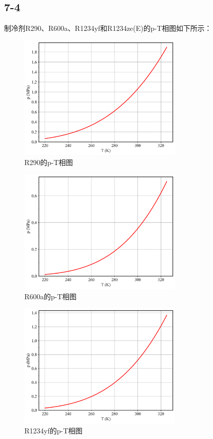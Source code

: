 \documentclass[12pt,a4paper]{article}
\begin{document}
\subsection*{7-4}
制冷剂R290、R600a、R1234yf和R1234ze(E)的p-T相图如下所示：
\begin{figure}[H]
    \centering
    \includegraphics[width=0.7\textwidth]{../chp7/figs/R290_pT.png}
    \caption{R290的p-T相图}
\end{figure}
\begin{figure}[H]
    \centering
    \includegraphics[width=0.7\textwidth]{../chp7/figs/R600a_pT.png}
    \caption{R600a的p-T相图}
\end{figure}
\begin{figure}[H]
    \centering
    \includegraphics[width=0.7\textwidth]{../chp7/figs/R1234yf_pT.png}
    \caption{R1234yf的p-T相图}
\end{figure}
\end{document}
